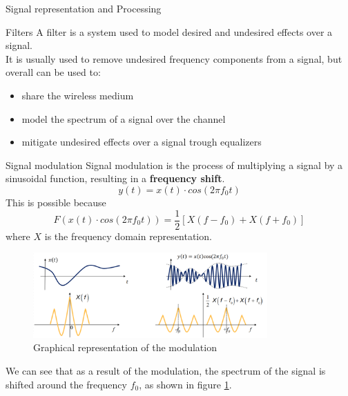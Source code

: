 \begin{section}{Signal representation and Processing}
  \begin{subsection}{Filters}
    A filter is a system used to model desired and undesired effects over a signal.\\
    It is usually used to remove undesired frequency components from a signal, but overall can be
    used to:
    \begin{itemize}
      \item share the wireless medium
      \item model the spectrum of a signal over the channel
      \item mitigate undesired effects over a signal trough equalizers
    \end{itemize}
    \end{subsection}
    \begin{subsection}{Signal modulation}
      Signal modulation is the process of multiplying a signal by a sinusoidal function, resulting
      in a \textbf{frequency shift}.
      \begin{equation}
        y(t) = x(t) \cdot cos(2\pi f_0 t)
      \end{equation}
      This is possible because
      \begin{equation}
        F(x(t) \cdot cos(2\pi f_0 t)) = \frac{1}{2}[X(f-f_0) + X(f+f_0)]
      \end{equation}
      where $X$ is the frequency domain representation.\\ 
      \begin{figure}[h]
        \centering
        \includegraphics[width=0.8\textwidth]{img/signal modulation.png}
        \caption{Graphical representation of the modulation}
        \label{fig:Modulation}
      \end{figure}
      We can see that as a result of the modulation, the spectrum of the signal is shifted around
      the frequency $f_0$, as shown in figure \ref{fig:Modulation}.\\


\end{subsection}
\end{section}

